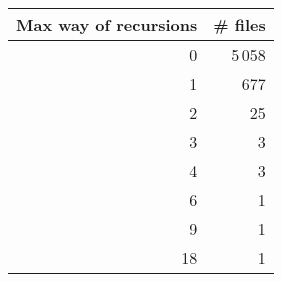 \begin{tabular}{|r|r|}
\hline
\bf Max way of recursions&\bf \# files\\
\hline
0&5\,058\\
\hline
1&677\\
\hline
2&25\\
\hline
3&3\\
\hline
4&3\\
\hline
6&1\\
\hline
9&1\\
\hline
18&1\\
\hline
\end{tabular}
